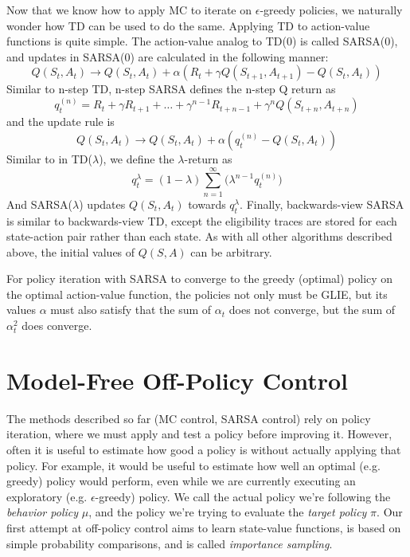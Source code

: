 \documentclass{article}
\newcommand{\ita}{\textit}
\newcommand{\eps}{\epsilon}
\begin{document}
Now that we know how to apply MC to iterate on $\eps$-greedy policies, we naturally wonder how TD can be used to do the same. Applying TD to action-value functions is quite simple. The action-value analog to TD(0) is called SARSA(0), and updates in SARSA(0) are calculated in the following manner:
\begin{equation}\label{eq:sarsa0_update}
Q(S_t, A_t) \rightarrow Q(S_t, A_t) + \alpha(R_t + \gamma Q(S_{t+1}, A_{t+1}) - Q(S_t, A_t))
\end{equation}
Similar to n-step TD, n-step SARSA defines the n-step Q return as
\begin{equation}\label{eq:n_step_sarsa_q_return}
q^{(n)}_t = R_t + \gamma R_{t+1} + \ldots + \gamma^{n-1}R_{t+n-1} + \gamma^nQ(S_{t+n}, A_{t+n})
\end{equation}
and the update rule is
\begin{equation}\label{eq:n_step_sarsa_update}
Q(S_t, A_t) \rightarrow Q(S_t, A_t) + \alpha(q^{(n)}_t - Q(S_t, A_t))
\end{equation}
Similar to in TD($\lambda$), we define the $\lambda$-return as
\begin{equation}\label{eq:sarsa_lambda_return}
q^\lambda_t = (1-\lambda)\sum_{n=1}^\infty\bigg(\lambda^{n-1}q^{(n)}_t\bigg)
\end{equation}
And SARSA($\lambda$) updates $Q(S_t, A_t)$ towards $q^\lambda_t$. Finally, backwards-view SARSA is similar to backwards-view TD, except the eligibility traces are stored for each state-action pair rather than each state. As with all other algorithms described above, the initial values of $Q(S, A)$ can be arbitrary. 

For policy iteration with SARSA to converge to the greedy (optimal) policy on the optimal action-value function, the policies not only must be GLIE, but its values $\alpha$ must also satisfy that the sum of $\alpha_t$ does not converge, but the sum of $\alpha^2_t$ does converge.

\section{Model-Free Off-Policy Control}

The methods described so far (MC control, SARSA control) rely on policy iteration, where we must apply and test a policy before improving it. However, often it is useful to estimate how good a policy is without actually applying that policy. For example, it would be useful to estimate how well an optimal (e.g. greedy) policy would perform, even while we are currently executing an exploratory (e.g. $\eps$-greedy) policy. We call the actual policy we're following the \ita{behavior policy} $\mu$, and the policy we're trying to evaluate the \ita{target policy} $\pi$. Our first attempt at off-policy control aims to learn state-value functions, is based on simple probability comparisons, and is called \ita{importance sampling}.
\end{document}
